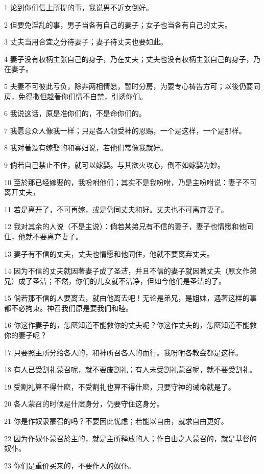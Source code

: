 \par 1 论到你们信上所提的事，我说男不近女倒好。
\par 2 但要免淫乱的事，男子当各有自己的妻子；女子也当各有自己的丈夫。
\par 3 丈夫当用合宜之分待妻子；妻子待丈夫也要如此。
\par 4 妻子没有权柄主张自己的身子，乃在丈夫；丈夫也没有权柄主张自己的身子，乃在妻子。
\par 5 夫妻不可彼此亏负，除非两相情愿，暂时分房，为要专心祷告方可；以後仍要同房，免得撒但趁著你们情不自禁，引诱你们。
\par 6 我说这话，原是准你们的，不是命你们的。
\par 7 我愿意众人像我一样；只是各人领受神的恩赐，一个是这样，一个是那样。
\par 8 我对著没有嫁娶的和寡妇说，若他们常像我就好。
\par 9 倘若自己禁止不住，就可以嫁娶。与其欲火攻心，倒不如嫁娶为妙。
\par 10 至於那已经嫁娶的，我吩咐他们；其实不是我吩咐，乃是主吩咐说：妻子不可离开丈夫，
\par 11 若是离开了，不可再嫁，或是仍同丈夫和好。丈夫也不可离弃妻子。
\par 12 我对其余的人说（不是主说）：倘若某弟兄有不信的妻子，妻子也情愿和他同住，他就不要离弃妻子。
\par 13 妻子有不信的丈夫，丈夫也情愿和他同住，他就不要离弃丈夫。
\par 14 因为不信的丈夫就因著妻子成了圣洁，并且不信的妻子就因著丈夫（原文作弟兄）成了圣洁；不然，你们的儿女就不洁净，但如今他们是圣洁的了。
\par 15 倘若那不信的人要离去，就由他离去吧！无论是弟兄，是姐妹，遇著这样的事都不必拘束。神召我们原是要我们和睦。
\par 16 你这作妻子的，怎麽知道不能救你的丈夫呢？你这作丈夫的，怎麽知道不能救你的妻子呢？
\par 17 只要照主所分给各人的，和神所召各人的而行。我吩咐各教会都是这样。
\par 18 有人已受割礼蒙召呢，就不要废割礼；有人未受割礼蒙召呢，就不要受割礼。
\par 19 受割礼算不得什麽，不受割礼也算不得什麽，只要守神的诫命就是了。
\par 20 各人蒙召的时候是什麽身分，仍要守住这身分。
\par 21 你是作奴隶蒙召的吗？不要因此忧虑；若能以自由，就求自由更好。
\par 22 因为作奴仆蒙召於主的，就是主所释放的人；作自由之人蒙召的，就是基督的奴仆。
\par 23 你们是重价买来的，不要作人的奴仆。
